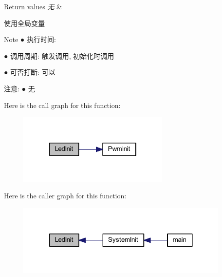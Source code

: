 \begin{DoxyRetVals}{\-Return values}
{\em 无} & \\
\hline
\end{DoxyRetVals}
\begin{DoxyParagraph}{使用全局变量 }

\end{DoxyParagraph}
\begin{DoxyNote}{\-Note}
● 执行时间\-: \par
 ● 调用周期\-: 触发调用, 初始化时调用 \par
 ● 可否打断\-: 可以 \par

\end{DoxyNote}
\begin{DoxyParagraph}{注意\-:}
● 无 \par
 
\end{DoxyParagraph}


\-Here is the call graph for this function\-:\nopagebreak
\begin{figure}[H]
\begin{center}
\leavevmode
\includegraphics[width=214pt]{group___l_e_d_ga1d5b4eaf7f01ae9557ba620158ebdfd9_cgraph}
\end{center}
\end{figure}




\-Here is the caller graph for this function\-:\nopagebreak
\begin{figure}[H]
\begin{center}
\leavevmode
\includegraphics[width=300pt]{group___l_e_d_ga1d5b4eaf7f01ae9557ba620158ebdfd9_icgraph}
\end{center}
\end{figure}


